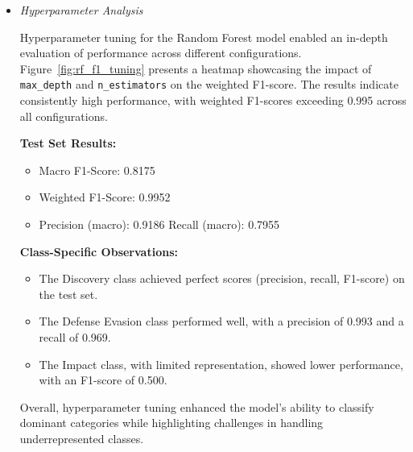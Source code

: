 \begin{itemize}

                \vspace{0.5em}

                \item \textit{Hyperparameter Analysis}
                
                    \vspace{0.3em}
                    

                    Hyperparameter tuning for the Random Forest model enabled an in-depth evaluation of performance across different configurations. Figure~\ref{fig:rf_f1_tuning} presents a heatmap showcasing the impact of \texttt{max\_depth} and \texttt{n\_estimators} on the weighted F1-score. The results indicate consistently high performance, with weighted F1-scores exceeding 0.995 across all configurations.

                    
                    \noindent\textbf{Test Set Results:}
                    \begin{itemize}
                        \item Macro F1-Score: 0.8175
                        \item Weighted F1-Score: 0.9952
                        \item Precision (macro): 0.9186 \quad Recall (macro): 0.7955
                    \end{itemize}

                    \noindent\textbf{Class-Specific Observations:}

                    \begin{itemize}
                        \item The Discovery class achieved perfect scores (precision, recall, F1-score) on the test set.
                        \item The Defense Evasion class performed well, with a precision of 0.993 and a recall of 0.969.
                        \item The Impact class, with limited representation, showed lower performance, with an F1-score of 0.500.
                    \end{itemize}

                    Overall, hyperparameter tuning enhanced the model's ability to classify dominant categories while highlighting challenges in handling underrepresented classes.
            

\end{itemize}
